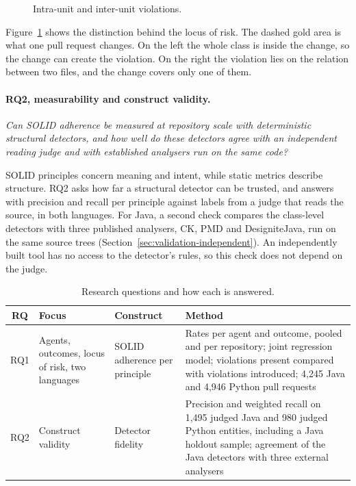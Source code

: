 \begin{figure}[htb]
\centering

\caption{Intra-unit and inter-unit violations.}
\label{fig:intra-inter}
\end{figure}

Figure~\ref{fig:intra-inter} shows the distinction behind the locus of risk. The dashed gold area is
what one pull request changes. On the left the whole class is inside the change, so the change can
create the violation. On the right the violation lies on the relation between two files, and the
change covers only one of them.

\paragraph{RQ2, measurability and construct validity.}
\emph{Can SOLID adherence be measured at repository scale with deterministic structural detectors,
and how well do these detectors agree with an independent reading judge and with established
analysers run on the same code?}

SOLID principles concern meaning and intent, while static metrics describe structure. RQ2 asks how
far a structural detector can be trusted, and answers with precision and recall per principle
against labels from a judge that reads the source, in both languages. For Java, a second check
compares the class-level detectors with three published analysers, CK, PMD and DesigniteJava, run on
the same source trees (Section~\ref{sec:validation-independent}). An independently built tool has
no access to the detector's rules, so this check does not depend on the judge.

\begin{table}[htb]
\centering
\caption{Research questions and how each is answered.}
\label{tab:rq-summary}
\begin{tabular}{@{}cL{3.0cm}L{3.2cm}L{5.4cm}@{}}
\toprule
\textbf{RQ} & \textbf{Focus} & \textbf{Construct} & \textbf{Method} \\
\midrule
RQ1 & Agents, outcomes, locus of risk, two languages & SOLID adherence per principle & Rates per agent
and outcome, pooled and per repository; joint regression model; violations present compared with
violations introduced; 4{,}245 Java and 4{,}946 Python pull requests \\
RQ2 & Construct validity & Detector fidelity & Precision and weighted recall on 1{,}495 judged Java
and 980 judged Python entities, including a Java holdout sample; agreement of the Java detectors with
three external analysers \\
\bottomrule
\end{tabular}
\end{table}


